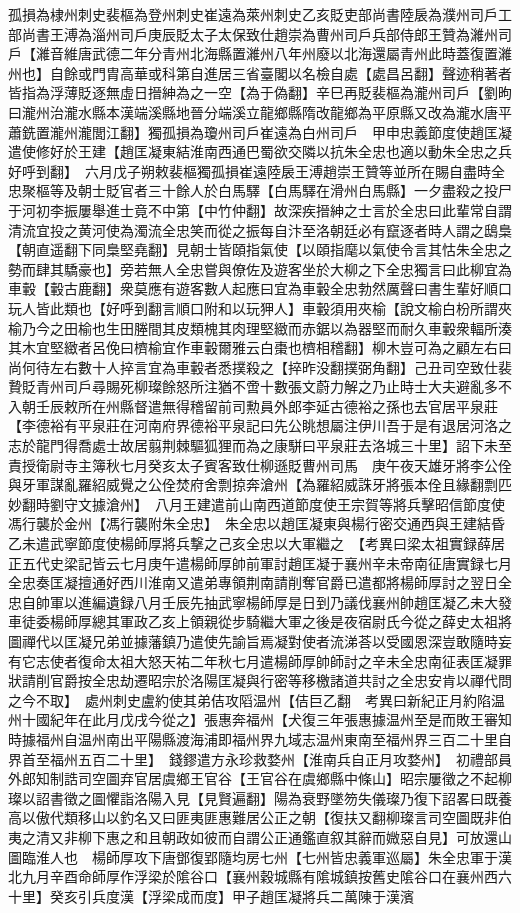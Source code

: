 孤損為棣州刺史裴樞為登州刺史崔遠為萊州刺史乙亥貶吏部尚書陸扆為濮州司戶工部尚書王溥為淄州司戶庚辰貶太子太保致仕趙崇為曹州司戶兵部侍郎王贊為濰州司戶【濰音維唐武德二年分青州北海縣置濰州八年州廢以北海還屬青州此時蓋復置濰州也】自餘或門胄高華或科第自進居三省臺閣以名檢自處【處昌呂翻】聲迹稍著者皆指為浮薄貶逐無虛日搢紳為之一空【為于偽翻】辛巳再貶裴樞為瀧州司戶【劉昫曰瀧州治瀧水縣本漢端溪縣地晉分端溪立龍鄉縣隋改龍鄉為平原縣又改為瀧水唐平蕭銑置瀧州瀧閭江翻】獨孤損為瓊州司戶崔遠為白州司戶　甲申忠義節度使趙匡凝遣使修好於王建【趙匡凝東結淮南西通巴蜀欲交隣以抗朱全忠也適以動朱全忠之兵好呼到翻】　六月戊子朔敕裴樞獨孤損崔遠陸扆王溥趙崇王贊等並所在賜自盡時全忠聚樞等及朝士貶官者三十餘人於白馬驛【白馬驛在滑州白馬縣】一夕盡殺之投尸于河初李振屢舉進士竟不中第【中竹仲翻】故深疾搢紳之士言於全忠曰此輩常自謂清流宜投之黄河使為濁流全忠笑而從之振每自汴至洛朝廷必有竄逐者時人謂之鴟梟【朝直遥翻下同梟堅堯翻】見朝士皆頤指氣使【以頤指麾以氣使令言其怙朱全忠之勢而肆其驕豪也】旁若無人全忠嘗與僚佐及遊客坐於大柳之下全忠獨言曰此柳宜為車轂【轂古鹿翻】衆莫應有遊客數人起應曰宜為車轂全忠勃然厲聲曰書生輩好順口玩人皆此類也【好呼到翻言順口附和以玩狎人】車轂須用夾榆【說文榆白枌所謂夾榆乃今之田榆也生田塍間其皮類槐其肉理堅緻而赤鋸以為器堅而耐久車轂衆輻所湊其木宜堅緻者呂俛曰櫅榆宜作車轂爾雅云白棗也櫅相稽翻】柳木豈可為之顧左右曰尚何待左右數十人捽言宜為車轂者悉撲殺之【捽昨没翻撲弼角翻】己丑司空致仕裴贄貶青州司戶尋賜死柳璨餘怒所注猶不啻十數張文蔚力解之乃止時士大夫避亂多不入朝壬辰敕所在州縣督遣無得稽留前司勲員外郎李延古德裕之孫也去官居平泉莊【李德裕有平泉莊在河南府界德裕平泉記曰先公眺想屬注伊川吾于是有退居河洛之志於龍門得喬處士故居翦荆棘驅狐狸而為之康駢曰平泉莊去洛城三十里】詔下未至責授衛尉寺主簿秋七月癸亥太子賓客致仕柳遜貶曹州司馬　庚午夜天雄牙將李公佺與牙軍謀亂羅紹威覺之公佺焚府舍剽掠奔滄州【為羅紹威誅牙將張本佺且緣翻剽匹妙翻時劉守文據滄州】　八月王建遣前山南西道節度使王宗賀等將兵擊昭信節度使馮行襲於金州【馮行襲附朱全忠】　朱全忠以趙匡凝東與楊行密交通西與王建結昏乙未遣武寧節度使楊師厚將兵撃之己亥全忠以大軍繼之　【考異曰梁太祖實録薛居正五代史梁記皆云七月庚午遣楊師厚帥前軍討趙匡凝于襄州辛未帝南征唐實録七月全忠奏匡凝擅通好西川淮南又遣弟專領荆南請削奪官爵已遣都將楊師厚討之翌日全忠自帥軍以進編遺録八月壬辰先抽武寧楊師厚是日到乃議伐襄州帥趙匡凝乙未大發車徒委楊師厚總其軍政乙亥上領親從步騎繼大軍之後是夜宿尉氏今從之薛史太祖將圖禪代以匡凝兄弟並據藩鎮乃遣使先諭旨焉凝對使者流涕荅以受國恩深豈敢隨時妄有它志使者復命太祖大怒天祐二年秋七月遣楊師厚帥師討之辛未全忠南征表匡凝罪狀請削官爵按全忠劫遷昭宗於洛陽匡凝與行密等移檄諸道共討之全忠安肯以禪代問之今不取】　處州刺史盧約使其弟佶攻䧟温州【佶巨乙翻　考異曰新紀正月約陷温州十國紀年在此月戊戌今從之】張惠奔福州【犬復三年張惠據温州至是而敗王審知時據福州自温州南出平陽縣渡海浦即福州界九域志温州東南至福州界三百二十里自界首至福州五百二十里】　錢鏐遣方永珍救婺州【淮南兵自正月攻婺州】　初禮部員外郎知制誥司空圖弃官居虞鄉王官谷【王官谷在虞鄉縣中條山】昭宗屢徵之不起柳璨以詔書徵之圖懼詣洛陽入見【見賢遍翻】陽為衰野墜笏失儀璨乃復下詔畧曰既養高以傲代類移山以釣名又曰匪夷匪惠難居公正之朝【復扶又翻柳璨言司空圖既非伯夷之清又非柳下惠之和且朝政如彼而自謂公正通鑑直叙其辭而媺惡自見】可放還山圖臨淮人也　楊師厚攻下唐鄧復郢隨均房七州【七州皆忠義軍巡屬】朱全忠軍于漢北九月辛酉命師厚作浮梁於隂谷口【襄州穀城縣有隂城鎮按舊史隂谷口在襄州西六十里】癸亥引兵度漢【浮梁成而度】甲子趙匡凝將兵二萬陳于漢濱